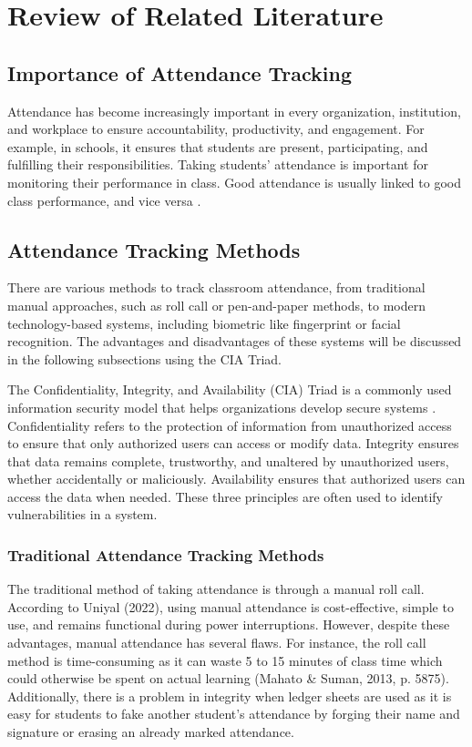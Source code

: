 \chapter{Review of Related Literature}
\label{sec:relatedlit}

\section{Importance of Attendance Tracking}

Attendance has become increasingly important in every organization, institution, and workplace to ensure accountability, productivity, and engagement. For example, in schools, it ensures that students are present, participating, and fulfilling their responsibilities. Taking students' attendance is important for monitoring their performance in class. Good attendance is usually linked to good class performance, and vice versa \cite{Zhi:2014}.


\section{Attendance Tracking Methods}

There are various methods to track classroom attendance, from traditional manual approaches, such as roll call or pen-and-paper methods, to modern technology-based systems, including biometric like fingerprint or facial recognition. The advantages and disadvantages of these systems will be discussed in the following subsections using the CIA Triad.

The Confidentiality, Integrity, and Availability (CIA) Triad is a commonly used information security model that helps organizations develop secure systems \cite{fruhlinger2024cia}.  Confidentiality refers to the protection of information from unauthorized access to ensure that only authorized users can access or modify data. Integrity ensures that data remains complete, trustworthy, and unaltered by unauthorized users, whether accidentally or maliciously. Availability ensures that authorized users can access the data when needed. These three principles are often used to identify vulnerabilities in a system.

\subsection{Traditional Attendance Tracking Methods}

The traditional method of taking attendance is through a manual roll call. According to Uniyal (2022), using manual attendance is cost-effective, simple to use, and remains functional during power interruptions. However, despite these advantages, manual attendance has several flaws. For instance, the roll call method is time-consuming as it can waste 5 to 15 minutes of class time which could otherwise be spent on actual learning (Mahato \& Suman, 2013, p. 5875). Additionally, there is a problem in integrity when ledger sheets are used as it is easy for students to fake another student’s attendance by forging their name and signature or erasing an already marked attendance.

